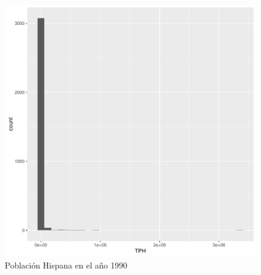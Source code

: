 \begin{figure}[H]
	\centering
\begin{knitrout}
\color{fgcolor}\begin{kframe}
\begin{alltt}
         \hlopt{+} \hlstd{()}
\end{alltt}
\end{kframe}
\includegraphics[width=\maxwidth]{figure/pobHis1990-1} 

\end{knitrout}
	\caption{Población Hispana en el año 1990}
\end{figure}

